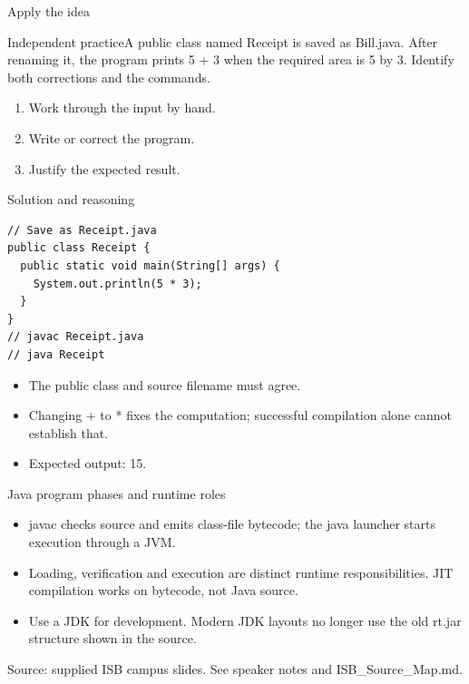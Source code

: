\documentclass[10pt,aspectratio=169]{beamer}
\begin{document}
\begin{frame}[fragile,t]{Apply the idea}
\begin{alertblock}{Independent practice}A public class named Receipt is saved as Bill.java. After renaming it, the program prints 5 + 3 when the required area is 5 by 3. Identify both corrections and the commands.\end{alertblock}\vspace{3mm}\begin{enumerate}\item Work through the input by hand.\item Write or correct the program.\item Justify the expected result.\end{enumerate}
\end{frame}

\begin{frame}[fragile,t]{Solution and reasoning}
\begin{lstlisting}
// Save as Receipt.java
public class Receipt {
  public static void main(String[] args) {
    System.out.println(5 * 3);
  }
}
// javac Receipt.java
// java Receipt
\end{lstlisting}\vspace{1mm}\small\begin{itemize}
\item The public class and source filename must agree.
\item Changing + to * fixes the computation; successful compilation alone cannot establish that.
\item Expected output: 15.
\end{itemize}
\end{frame}

\begin{frame}[fragile,t]{Java program phases and runtime roles}
\begin{itemize}
\item javac checks source and emits class{-}file bytecode; the java launcher starts execution through a JVM.
\item Loading, verification and execution are distinct runtime responsibilities. JIT compilation works on bytecode, not Java source.
\item Use a JDK for development. Modern JDK layouts no longer use the old rt.jar structure shown in the source.
\end{itemize}
\vspace{3mm}\footnotesize\textcolor{accent}{Source: supplied ISB campus slides. See speaker notes and ISB\_Source\_Map.md.}
\end{frame}
\end{document}
